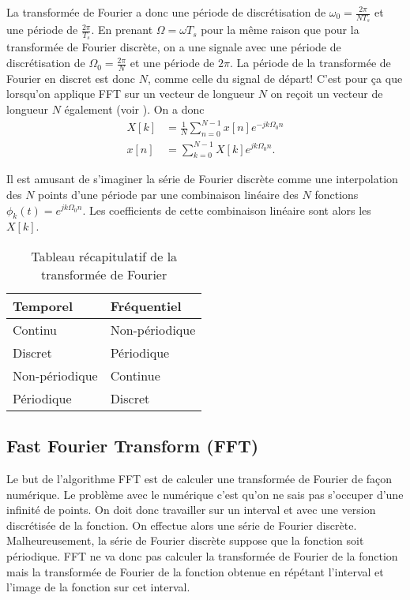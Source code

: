 La transformée de Fourier a donc une période de discrétisation de $\omega_0 = \frac{2\pi}{NT_s}$
et une période de $\frac{2\pi}{T_s}$.
En prenant $\Omega = \omega T_s$ pour la même raison que pour la transformée de Fourier discrète,
on a une signale avec une période de discrétisation de $\Omega_0 = \frac{2\pi}{N}$ et une période
de $2 \pi$.
La période de la transformée de Fourier en discret est donc $N$, comme celle du signal de départ!
C'est pour ça que lorsqu'on applique FFT sur un vecteur de longueur $N$ on reçoit un vecteur de longueur
$N$ également (voir ).
On a donc
\begin{align}
  \label{eq:sfd}
  X[k] & = \frac{1}{N} \sum_{n=0}^{N-1}x[n]e^{-jk\Omega_0n}\\
  \nonumber
  x[n] & = \sum_{k=0}^{N-1}X[k]e^{jk\Omega_0n}.
\end{align}

Il est amusant de s'imaginer la série de Fourier discrète
comme une interpolation des $N$ points d'une période par
une combinaison linéaire des $N$ fonctions $\phi_k(t) = e^{jk\Omega_0n}$.
Les coefficients de cette combinaison linéaire sont alors les $X[k]$.

\begin{table}
  \centering
  \begin{tabular}{|l|l|}
    \hline
    \textbf{Temporel} & \textbf{Fréquentiel}\\
    \hline
    Continu & Non-périodique\\
    \hline
    Discret & Périodique\\
    \hline
    Non-périodique & Continue\\
    \hline
    Périodique & Discret\\
    \hline
  \end{tabular}
  \caption{Tableau récapitulatif de la transformée de Fourier}
  \label{tab:recap_fourier}
\end{table}

\subsection{Fast Fourier Transform (FFT)}
\label{sec:fft}
Le but de l'algorithme FFT est de calculer une transformée de Fourier de façon numérique.
Le problème avec le numérique c'est qu'on ne sais pas s'occuper d'une infinité de points.
On doit donc travailler sur un interval et avec une version discrétisée de la fonction.
On effectue alors une série de Fourier discrète.
Malheureusement, la série de Fourier discrète suppose que la fonction soit périodique.
FFT ne va donc pas calculer la transformée de Fourier de la fonction mais la transformée
de Fourier de la fonction obtenue en répétant l'interval et l'image de la fonction sur cet interval.

